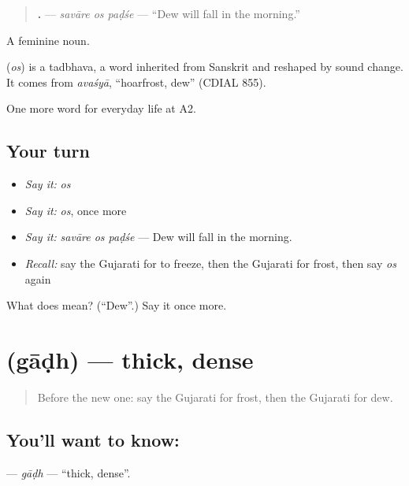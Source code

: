 \begin{quote}
\textbf{  .} — \emph{savāre os paḍśe} — \textquotedblleft{}Dew will fall in the morning.\textquotedblright{}
\end{quote}

A feminine noun.

\begin{cousinweb}
\textbf{} (\emph{os}) is a tadbhava, a word inherited from Sanskrit and reshaped by sound change. It comes from \emph{avaśyā}, \textquotedblleft{}hoarfrost, dew\textquotedblright{} (CDIAL 855).
\end{cousinweb}

\begin{grammarlens}[title={What you've built}]
One more word for everyday life at A2.
\end{grammarlens}

\subsection*{Your turn}
\begin{itemize}
\raggedright
  \item \emph{Say it:} \emph{os}
  \item \emph{Say it:} \emph{os}, once more
  \item \emph{Say it:} \emph{savāre os paḍśe} — Dew will fall in the morning.
  \item \emph{Recall:} say the Gujarati for to freeze, then the Gujarati for frost, then say \emph{os} again
\end{itemize}

\begin{tcolorbox}[breakable,colback=teal!4,colframe=teal!35!black,title={Before you move on}]
What does  mean? (\textquotedblleft{}Dew\textquotedblright{}.) Say it once more.
\end{tcolorbox}
\section[\texorpdfstring{\gu{ગાઢ} (gāḍh)}{ગાઢ (gāḍh)}]{ (gāḍh) — thick, dense}

\label{lesson:GU-C215-gadh}



\begin{quote}
Before the new one: say the Gujarati for frost, then the Gujarati for dew.
\end{quote}

\subsection*{You'll want to know: }
\textbf{} — \emph{gāḍh} — \textquotedblleft{}thick, dense\textquotedblright{}.

